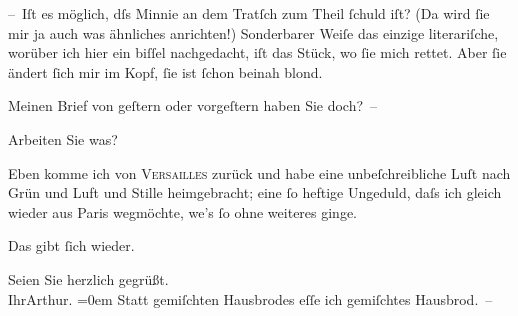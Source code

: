 \pstart
           – Iſt es möglich, dſs Minnie an dem Tratſch
               zum Theil{ }ſchuld iſt? (Da wird{ }ſie mir ja auch was ähnliches anrichten!) Sonderbarer
               Weiſe das einzige literariſche, worüber ich hier ein biſſel nachgedacht, iſt das Stück, wo ſie mich {\pb}rettet. Aber{ }ſie ändert{ }ſich mir im Kopf,{ }ſie ist{ }ſchon beinah blond.\pend
           
\pstart
           Meinen Brief von geſtern oder vorgeſtern haben Sie doch? –\pend
           
\pstart
           Arbeiten Sie was?\pend
           
\pstart
           Eben komme ich von \textsc{Versailles} zurück und habe eine unbeſchreibliche Luſt nach Grün und Luft und Stille
                  heimge{\pb}bracht; eine{ }ſo heftige Ungeduld, daſs ich
               gleich wieder aus Paris wegmöchte, we{\geminationn}’s{ }ſo ohne
               weiteres ginge.\pend
           
\pstart
           Das gibt{ }ſich wieder.\pend
           
\pstart
           Seien Sie herzlich gegrüßt.{\\[\baselineskip]}Ihr\spacefill\mbox{Arthur.}\pend
           \leftskip=0em{}
\pstart
           \noindent{}Statt gemiſchten Hausbrodes eſſe ich gemiſchtes Hausbrod. –\pend
           \endnumbering{}  \newcommand{\dateiname}{L00672}\newcommand{\titel}{Arthur Schnitzler an Hugo von Hofmannsthal, 28. 4. 1897}\newcommand{\editorInnen}{Martin Anton Müller und Gerd-Hermann Susen}
